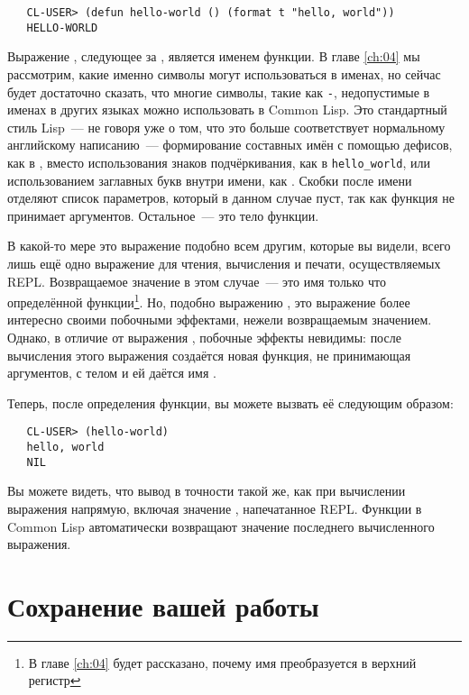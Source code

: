 \begin{verbatim}
   CL-USER> (defun hello-world () (format t "hello, world"))
   HELLO-WORLD
\end{verbatim}

Выражение , следующее за , является именем функции. В главе \ref{ch:04} мы
рассмотрим, какие именно символы могут использоваться в именах, но сейчас будет достаточно
сказать, что многие символы, такие как \lstinline|-|, недопустимые в именах в других
языках можно использовать в Common Lisp. Это стандартный стиль Lisp~--- не говоря уже о том,
что это больше соответствует нормальному английскому написанию~--- формирование составных имён с помощью дефисов,
как в , вместо использования знаков подчёркивания, как в \lstinline|hello_world|, или
использованием заглавных букв внутри имени, как . Скобки \code{()} после имени отделяют
список параметров, который в данном случае пуст, так как функция не принимает
аргументов. Остальное~--- это тело функции.

В какой-то мере это выражение подобно всем другим, которые вы видели, всего лишь ещё одно
выражение для чтения, вычисления и печати, осуществляемых REPL. Возвращаемое значение в
этом случае~--- это имя только что определённой функции\footnote{В главе \ref{ch:04} будет рассказано,
  почему имя преобразуется в верхний регистр}. Но, подобно выражению , это выражение
более интересно своими побочными эффектами, нежели возвращаемым значением. Однако, в
отличие от выражения , побочные эффекты невидимы: после вычисления этого выражения
создаётся новая функция, не принимающая аргументов, с телом  и ей даётся имя .

Теперь, после определения функции, вы можете вызвать её следующим образом:

\begin{verbatim}
   CL-USER> (hello-world)
   hello, world
   NIL
\end{verbatim}

Вы можете видеть, что вывод в точности такой же, как при вычислении выражения 
напрямую, включая значение , напечатанное REPL. Функции в Common Lisp автоматически
возвращают значение последнего вычисленного выражения.

\section{Сохранение вашей работы}

